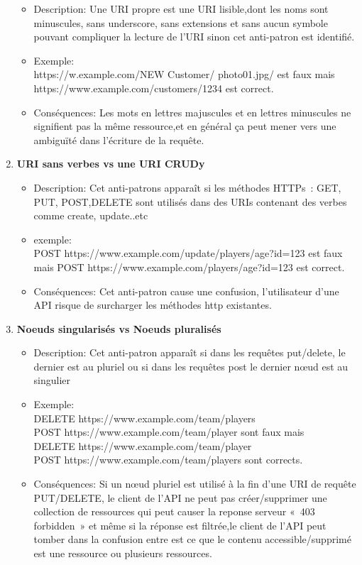 \begin{enumerate}
\begin{itemize}
\item Description: Une URI propre est une URI lisible,dont les noms sont minuscules, sans underscore, sans extensions et sans aucun symbole pouvant compliquer la lecture de l’URI sinon cet anti-patron est identifié.
\item Exemple:\\
https://w\itemww.example.com/NEW Customer/ photo01.jpg/ est faux mais \\
https://www.example.com/customers/1234 est correct.
\item Conséquences: Les mots en lettres majuscules et en lettres minuscules ne signifient pas la même ressource,et en général ça peut mener vers une ambiguïté dans l'écriture de la requête.
\end{itemize}
\item \textbf{URI sans verbes vs une URI CRUDy}
\begin{itemize}
    

\item Description: Cet anti-patrons apparaît si les méthodes HTTPs : GET, PUT, POST,DELETE sont utilisés dans des URIs contenant des verbes comme create, update..etc
\item exemple:\\
POST https://www.example.com/update/players/age?id=123 est faux\\
mais POST https://www.example.com/players/age?id=123 est correct.
\item Conséquences:
Cet anti-patron cause une confusion, l’utilisateur d’une API risque de surcharger les méthodes http existantes.
\end{itemize}
\item \textbf{Noeuds singularisés vs Noeuds pluralisés}
\begin{itemize}
    

\item Description: Cet anti-patron apparaît si dans les requêtes put/delete, le dernier est au pluriel ou si dans les requêtes post le dernier nœud est au singulier
\item Exemple:\\
DELETE https://www.example.com/team/players \\
 POST https://www.example.com/team/player sont faux mais \\
DELETE https://www.example.com/team/player \\
 POST https://www.example.com/team/players sont corrects.
\item Conséquences:
Si un nœud pluriel est utilisé à la fin d’une URI de requête PUT/DELETE, le client de l’API ne peut pas créer/supprimer une collection de ressources qui peut causer la reponse serveur « 403 forbidden » et même si la réponse est filtrée,le client de l’API peut tomber dans la confusion entre est ce que le contenu accessible/supprimé est une ressource ou plusieurs ressources.
\end{itemize}
\end{enumerate}

